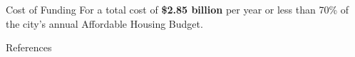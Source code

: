 \documentclass[final]{beamer}
\newlength{\sepwidth}
\newlength{\colwidth}
\newcommand{\separatorcolumn}{\begin{column}{\sepwidth}\end{column}}
\begin{document}
\begin{frame}[t]
\begin{columns}[t]
\begin{column}{\colwidth}
\begin{block}{Cost of Funding}
    For a total cost of \textbf{\$2.85 billion} per year or less than 70\% of the city's annual Affordable Housing Budget.
  
  \end{block}


  \begin{block}{References}

    \vspace{-1cm}

    \begin{multicols}{2}
    \nocite{*}
    \small{}
    
    \end{multicols}

  \end{block}


  
\end{column}

\separatorcolumn
\end{columns}
\end{frame}
\end{document}
